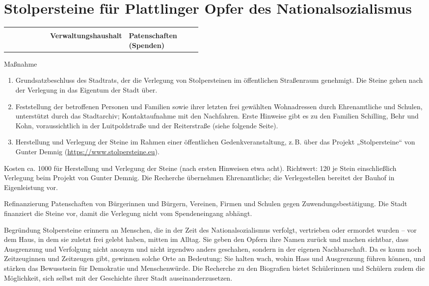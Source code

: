 \documentclass[11pt, a4paper]{article}
\makeatletter
\newcommand{\rubrik}[1]{{\small\bfseries\color{GruenAccent}\textls[80]{\MakeUppercase{#1}}}}
\newcommand{\kennzahl}[1]{\leavevmode{\scriptsize\color{Grau}\textls[60]{\MakeUppercase{#1}}}}
\newcommand{\massnahme}[3]{%
  \rubrik{#1}\par\nobreak\vspace{1mm}%
  \section{#2}\label{#3}}
\newcommand{\eckdaten}[3]{%
  \begin{tcolorbox}[enhanced, colback=GruenLight, frame hidden, arc=1.5mm,
      left=5mm, right=5mm, top=2.5mm, bottom=2.5mm, before skip=0pt, after skip=5mm]
    \begin{tabularx}{\linewidth}{@{}p{0.22\linewidth} p{0.24\linewidth} >{\raggedright\arraybackslash}X@{}}
      \kennzahl{Ansatz 2027} & \kennzahl{Haushalt} & \kennzahl{Förderung / Finanzierung} \\[0.5mm]
      \leavevmode{\Large\bfseries\color{GruenPrimary}#1} & \bfseries #2 & \bfseries #3
    \end{tabularx}
  \end{tcolorbox}}
\makeatother
\begin{document}
\massnahme{Erinnerungskultur}{Stolpersteine für Plattlinger Opfer des Nationalsozialismus}{m:stolpersteine}

\eckdaten{\qty{1000}{\EUR}}{Verwaltungshaushalt}{Patenschaften (Spenden)}

\begin{steckbrief}
  \item[Maßnahme] \begin{enumerate}
      \item Grundsatzbeschluss des Stadtrats, der die Verlegung von Stolpersteinen im öffentlichen Straßenraum genehmigt. Die Steine gehen nach der Verlegung in das Eigentum der Stadt über.
      \item Feststellung der betroffenen Personen und Familien sowie ihrer letzten frei gewählten Wohnadressen durch Ehrenamtliche und Schulen, unterstützt durch das Stadtarchiv; Kontaktaufnahme mit den Nachfahren. Erste Hinweise gibt es zu den Familien Schilling, Behr und Kohn, voraussichtlich in der Luitpoldstraße und der Reiterstraße (siehe folgende Seite).
      \item Herstellung und Verlegung der Steine im Rahmen einer öffentlichen Gedenkveranstaltung, z.\,B. über das Projekt „Stolpersteine“ von Gunter Demnig (\url{https://www.stolpersteine.eu}).
    \end{enumerate}
  \item[Kosten] ca. \qty{1000}{\EUR} für Herstellung und Verlegung der Steine (nach ersten Hinweisen etwa acht). Richtwert: \qty{120}{\EUR} je Stein einschließlich Verlegung beim Projekt von Gunter Demnig. Die Recherche übernehmen Ehrenamtliche; die Verlegestellen bereitet der Bauhof in Eigenleistung vor.
  \item[Refinanzierung] Patenschaften von Bürgerinnen und Bürgern, Vereinen, Firmen und Schulen gegen Zuwendungsbestätigung. Die Stadt finanziert die Steine vor, damit die Verlegung nicht vom Spendeneingang abhängt.
  \item[Begründung] Stolpersteine erinnern an Menschen, die in der Zeit des Nationalsozialismus verfolgt, vertrieben oder ermordet wurden – vor dem Haus, in dem sie zuletzt frei gelebt haben, mitten im Alltag. Sie geben den Opfern ihre Namen zurück und machen sichtbar, dass Ausgrenzung und Verfolgung nicht anonym und nicht irgendwo anders geschahen, sondern in der eigenen Nachbarschaft. Da es kaum noch Zeitzeuginnen und Zeitzeugen gibt, gewinnen solche Orte an Bedeutung: Sie halten wach, wohin Hass und Ausgrenzung führen können, und stärken das Bewusstsein für Demokratie und Menschenwürde. Die Recherche zu den Biografien bietet Schülerinnen und Schülern zudem die Möglichkeit, sich selbst mit der Geschichte ihrer Stadt auseinanderzusetzen.
\end{steckbrief}
\end{document}
